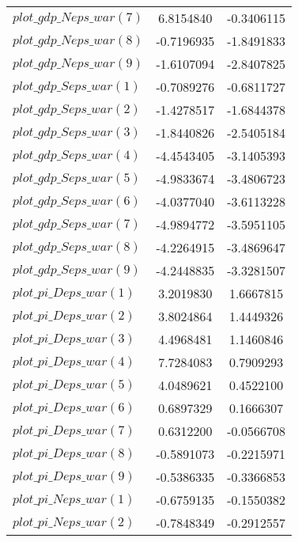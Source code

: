 \begin{center}
\begin{longtable}{lcc}
$plot\_gdp\_N eps\_war (7)  $	 & 	      6.8154840	 & 	     -0.3406115 \\ 
$plot\_gdp\_N eps\_war (8)  $	 & 	     -0.7196935	 & 	     -1.8491833 \\ 
$plot\_gdp\_N eps\_war (9)  $	 & 	     -1.6107094	 & 	     -2.8407825 \\ 
$plot\_gdp\_S eps\_war (1)  $	 & 	     -0.7089276	 & 	     -0.6811727 \\ 
$plot\_gdp\_S eps\_war (2)  $	 & 	     -1.4278517	 & 	     -1.6844378 \\ 
$plot\_gdp\_S eps\_war (3)  $	 & 	     -1.8440826	 & 	     -2.5405184 \\ 
$plot\_gdp\_S eps\_war (4)  $	 & 	     -4.4543405	 & 	     -3.1405393 \\ 
$plot\_gdp\_S eps\_war (5)  $	 & 	     -4.9833674	 & 	     -3.4806723 \\ 
$plot\_gdp\_S eps\_war (6)  $	 & 	     -4.0377040	 & 	     -3.6113228 \\ 
$plot\_gdp\_S eps\_war (7)  $	 & 	     -4.9894772	 & 	     -3.5951105 \\ 
$plot\_gdp\_S eps\_war (8)  $	 & 	     -4.2264915	 & 	     -3.4869647 \\ 
$plot\_gdp\_S eps\_war (9)  $	 & 	     -4.2448835	 & 	     -3.3281507 \\ 
$plot\_pi\_D eps\_war (1)   $	 & 	      3.2019830	 & 	      1.6667815 \\ 
$plot\_pi\_D eps\_war (2)   $	 & 	      3.8024864	 & 	      1.4449326 \\ 
$plot\_pi\_D eps\_war (3)   $	 & 	      4.4968481	 & 	      1.1460846 \\ 
$plot\_pi\_D eps\_war (4)   $	 & 	      7.7284083	 & 	      0.7909293 \\ 
$plot\_pi\_D eps\_war (5)   $	 & 	      4.0489621	 & 	      0.4522100 \\ 
$plot\_pi\_D eps\_war (6)   $	 & 	      0.6897329	 & 	      0.1666307 \\ 
$plot\_pi\_D eps\_war (7)   $	 & 	      0.6312200	 & 	     -0.0566708 \\ 
$plot\_pi\_D eps\_war (8)   $	 & 	     -0.5891073	 & 	     -0.2215971 \\ 
$plot\_pi\_D eps\_war (9)   $	 & 	     -0.5386335	 & 	     -0.3366853 \\ 
$plot\_pi\_N eps\_war (1)   $	 & 	     -0.6759135	 & 	     -0.1550382 \\ 
$plot\_pi\_N eps\_war (2)   $	 & 	     -0.7848349	 & 	     -0.2912557 \\ 

\end{longtable}
\end{center}
